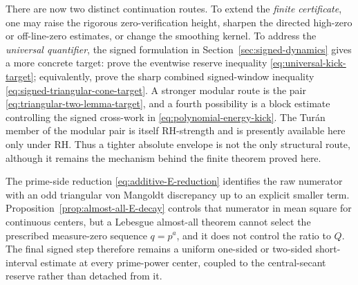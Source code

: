 \documentclass[11pt,a4paper]{article}
\numberwithin{equation}{section}
\theoremstyle{definition}
\begin{document}
There are now two distinct continuation routes.  To extend the
\emph{finite certificate}, one may raise the rigorous zero-verification
height, sharpen the directed high-zero or off-line-zero estimates, or change
the smoothing kernel.  To address the \emph{universal quantifier}, the signed
formulation in Section~\ref{sec:signed-dynamics} gives a more concrete target:
prove the eventwise reserve inequality
\eqref{eq:universal-kick-target}; equivalently, prove the sharp combined
signed-window inequality \eqref{eq:signed-triangular-cone-target}.  A stronger
modular route is the pair \eqref{eq:triangular-two-lemma-target}, and a fourth
possibility is a block estimate controlling the signed cross-work in
\eqref{eq:polynomial-energy-kick}.  The Tur\'an member of the modular pair is
itself RH-strength and is presently available here only under RH.  Thus a
tighter absolute envelope is not the only structural route, although it
remains the mechanism behind the finite theorem proved here.

The prime-side reduction \eqref{eq:additive-E-reduction} identifies the raw
numerator with an odd triangular von Mangoldt discrepancy up to an explicit
smaller term.  Proposition~\ref{prop:almost-all-E-decay} controls that
numerator in mean square for continuous centers, but a Lebesgue almost-all
theorem cannot select the prescribed measure-zero sequence \(q=p^a\), and it
does not control the ratio to \(Q\).  The final signed step therefore remains
a uniform one-sided or two-sided short-interval estimate at every
prime-power center, coupled to the central-secant reserve rather than
detached from it.
\end{document}
